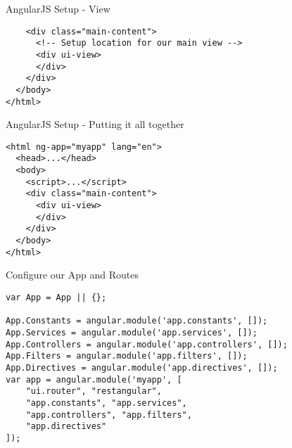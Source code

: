 \documentclass[presentation]{beamer}
\begin{document}
\begin{frame}[fragile,label=sec-1-6]{AngularJS Setup - View}
 \begin{verbatim}
    <div class="main-content">
      <!-- Setup location for our main view -->
      <div ui-view>
      </div>
    </div>
  </body>
</html>
\end{verbatim}
\end{frame}

\begin{frame}[fragile,label=sec-1-7]{AngularJS Setup - Putting it all together}
 \begin{verbatim}
<html ng-app="myapp" lang="en">
  <head>...</head>
  <body>
    <script>...</script>
    <div class="main-content">
      <div ui-view>
      </div>
    </div>
  </body>
</html>
\end{verbatim}
\end{frame}

\begin{frame}[fragile,label=sec-1-8]{Configure our App and Routes}
 \begin{verbatim}
var App = App || {};

App.Constants = angular.module('app.constants', []);
App.Services = angular.module('app.services', []);
App.Controllers = angular.module('app.controllers', []);
App.Filters = angular.module('app.filters', []);
App.Directives = angular.module('app.directives', []);
var app = angular.module('myapp', [
    "ui.router", "restangular",
    "app.constants", "app.services",
    "app.controllers", "app.filters",
    "app.directives"
]);
\end{verbatim}
\end{frame}
\end{document}
